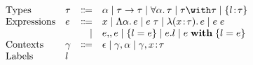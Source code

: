 \[
\begin{array}{l}
  \begin{array}{llrl}
    \text{Types} 
    & \ty & \Coloneqq & \alpha \mid \ty \to \ty \mid \Forall \alpha \ty \mid
                        \ty \Intersect \ty \mid \RecTy l \ty \\
    \text{Expressions} 
    & e & \Coloneqq & x \mid \BLam \alpha e \mid \TApp e \ty \mid \Lam x \ty e \mid \App e e \\
    &   & \mid      & e \Merge e \mid \RecCon l e \mid  e.l \mid \RecUpd e l e \\
    \text{Contexts} 
    & \gamma & \Coloneqq & \epsilon \mid \gamma, \alpha \mid \gamma, x \hast \ty \\
    \text{Labels} & l
  \end{array} 
\end{array}
\]
